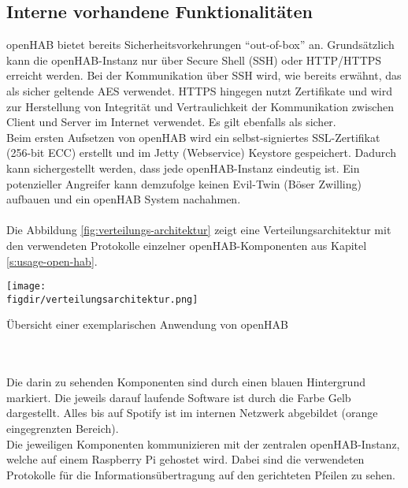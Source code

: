 \subsection{Interne vorhandene Funktionalitäten}
openHAB bietet bereits Sicherheitsvorkehrungen "`out-of-box"' an. Grundsätzlich kann die openHAB-Instanz nur über Secure Shell (SSH) oder HTTP/HTTPS erreicht werden. Bei der Kommunikation über SSH wird, wie bereits erwähnt, das als sicher geltende AES verwendet. HTTPS hingegen nutzt Zertifikate und wird zur Herstellung von Integrität und Vertraulichkeit der Kommunikation zwischen Client und Server im Internet verwendet. Es gilt ebenfalls als sicher.\\
Beim ersten Aufsetzen von openHAB wird ein selbst-signiertes SSL-Zertifikat (256-bit ECC) erstellt und im Jetty (Webservice) Keystore gespeichert. Dadurch kann sichergestellt werden, dass jede openHAB-Instanz eindeutig ist. Ein potenzieller Angreifer kann demzufolge keinen Evil-Twin (Böser Zwilling) aufbauen und ein openHAB System nachahmen.\\
\\
Die Abbildung \ref{fig:verteilungs-architektur} zeigt eine Verteilungsarchitektur mit den verwendeten Protokolle einzelner openHAB-Komponenten aus Kapitel \ref{s:usage-open-hab}.\\
\begin{minipage}{\textwidth}
	\centering
	\captionsetup{type=figure}
	\texttt{[image: \\figdir/verteilungsarchitektur.png]}
	\caption{Übersicht einer exemplarischen Anwendung von openHAB \label{fig:verteilungs-architektur}}
\end{minipage}
\\
\\
Die darin zu sehenden Komponenten sind durch einen blauen Hintergrund markiert. Die jeweils darauf laufende Software ist durch die Farbe Gelb dargestellt. Alles bis auf Spotify ist im internen Netzwerk abgebildet (orange eingegrenzten Bereich).\\
Die jeweiligen Komponenten kommunizieren mit der zentralen openHAB-Instanz, welche auf einem Raspberry Pi gehostet wird. Dabei sind die verwendeten Protokolle für die Informationsübertragung auf den gerichteten Pfeilen zu sehen.

